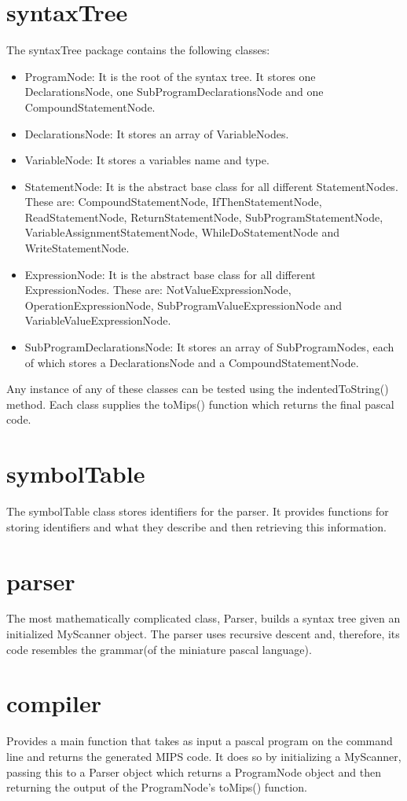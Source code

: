 \documentclass[12pt]{article}
\begin{document}
	\section*{syntaxTree}
	The syntaxTree package contains the following classes:
	\begin{itemize}
		\item ProgramNode: It is the root of the syntax tree. It stores one DeclarationsNode, one SubProgramDeclarationsNode and one CompoundStatementNode.
		\item DeclarationsNode: It stores an array of VariableNodes.
		\item VariableNode: It stores a variables name and type.
		\item StatementNode: It is the abstract base class for all different StatementNodes. These are: CompoundStatementNode, IfThenStatementNode, ReadStatementNode, ReturnStatementNode, SubProgramStatementNode, VariableAssignmentStatementNode, WhileDoStatementNode and WriteStatementNode.
		\item ExpressionNode: It is the abstract base class for all different ExpressionNodes. These are: NotValueExpressionNode, OperationExpressionNode, SubProgramValueExpressionNode and VariableValueExpressionNode.
		\item SubProgramDeclarationsNode: It stores an array of SubProgramNodes, each of which stores a DeclarationsNode and a CompoundStatementNode.
	\end{itemize}
	Any instance of any of these classes can be tested using the indentedToString() method. Each class supplies the toMips() function which returns the final pascal code.
	
	\section*{symbolTable}
	The symbolTable class stores identifiers for the parser. It provides functions for storing identifiers and what they describe and then retrieving this information.
	
	\section*{parser}
	The most mathematically complicated class, Parser, builds a syntax tree given an initialized MyScanner object. The parser uses recursive descent and, therefore, its code resembles the grammar(of the miniature pascal language).
	
	\section*{compiler}
	Provides a main function that takes as input a pascal program on the command line and returns the generated MIPS code. It does so by initializing a MyScanner, passing this to a Parser object which returns a ProgramNode object and then returning the output of the ProgramNode's toMips() function.
	
\end{document}

